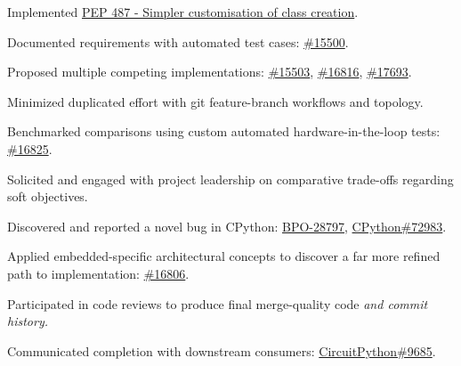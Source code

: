 


\begin{tightemize}
  \item Implemented \href{https://peps.python.org/pep-0487/}{PEP 487 - Simpler customisation of class creation}.
  \begin{tightemize}
    \item Documented requirements with automated test cases:
      \href{https://github.com/micropython/micropython/pull/15500}{\#15500}.
    \item Proposed multiple competing implementations:
      \href{https://github.com/micropython/micropython/pull/16816}{\#15503},
      \href{https://github.com/micropython/micropython/pull/16816}{\#16816},
      \href{https://github.com/micropython/micropython/pull/17693}{\#17693}.
    \item Minimized duplicated effort with git feature-branch workflows and topology.
    \item Benchmarked comparisons using custom automated hardware-in-the-loop tests:
      \href{https://github.com/micropython/micropython/pull/16825}{\#16825}.
    \item Solicited and engaged with project leadership on comparative trade-offs regarding soft objectives.
    \item Discovered and reported a novel bug in CPython:
      \href{https://bugs.python.org/issue28797}{BPO-28797},
      \href{https://github.com/python/cpython/issues/72983}{CPython\#72983}.
    \item Applied embedded-specific architectural concepts to discover a far more refined path to implementation:
      \href{https://github.com/micropython/micropython/pull/16806}{\#16806}.
    \item Participated in code reviews to produce final merge-quality code \em{and} commit history.
    \item Communicated completion with downstream consumers:
      \href{https://github.com/adafruit/circuitpython/issues/9685}{CircuitPython\#9685}.
  \end{tightemize}

\end{tightemize}

